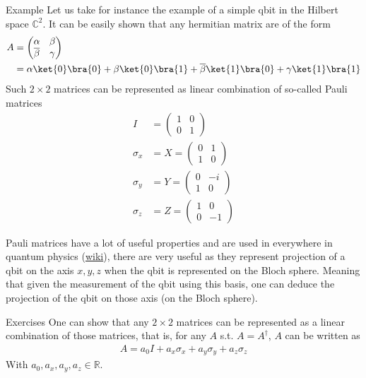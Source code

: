\begin{parag}{Example}
    Let us take for instance the example of a simple qbit in the Hilbert space $\mathbb{C}^2$. It can be easily shown that any hermitian matrix are of the form 
	\begin{align*} 
		A &= \begin{pmatrix} \alpha & \beta \\ \overline{\beta} & \gamma \end{pmatrix}  \\
								   &= \alpha \ket{0}\bra{0} + \beta \ket{0}\bra{1} + \overline{\beta}\ket{1}\bra{0} + \gamma \ket{1}\bra{1}
	\end{align*}
	Such $2 \times 2$ matrices can be represented as linear combination of so-called Pauli matrices 
	\begin{align*} 
		I &= \begin{pmatrix} 1 & 0 \\ 0 & 1 \end{pmatrix}  \\
		\sigma_x &= X = \begin{pmatrix} 0 & 1 \\ 1 & 0 \end{pmatrix} \\
		\sigma_y &= Y = \begin{pmatrix} 0 & -i \\ 1 & 0 \end{pmatrix} \\
		\sigma_z &= Z = \begin{pmatrix} 1 & 0 \\ 0 & -1 \end{pmatrix} 
	\end{align*}
	\begin{framedremark}
		Pauli matrices have a lot of useful properties and are used in everywhere in quantum physics (\href{https://en.wikipedia.org/wiki/Pauli_matrices}{wiki}), there are very useful as they represent projection of a qbit on the axis $x, y, z$ when the qbit is represented on the Bloch sphere. Meaning that given the measurement of the qbit using this basis, one can deduce the projection of the qbit on those axis (on the Bloch sphere).
	\end{framedremark}
	\begin{subparag}{Exercises}
	    One can show that any $2 \times 2$ matrices can be represented as a linear combination of those matrices, that is, for any $A$ s.t. $A =  A^{\dagger}$, $A$ can be written as 
		\begin{align*} 
			A = a_0 I + a_x \sigma_x + a_y \sigma_y + a_z \sigma_z 
		\end{align*}
		With $a_0, a_x, a_y, a_z \in \mathbb{R}$.
	\end{subparag}
\end{parag}
